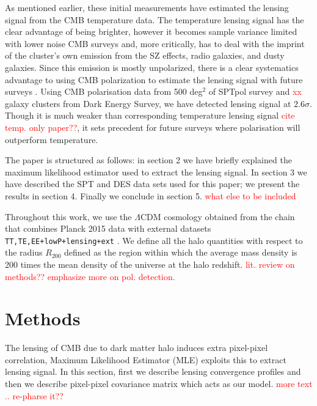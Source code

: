 \documentclass[twocolumn]{aastex61}
\newcommand{\pending}[1]{\textcolor{red}{#1}}
\begin{document}
As mentioned earlier, these initial measurements have estimated the lensing signal from the CMB temperature data. The temperature lensing signal has the clear advantage of being brighter, however it becomes sample variance limited with lower noise CMB surveys \citep{hu07, raghunathan17a} and, more critically, has to deal with the imprint of the cluster's own emission from the SZ effects, radio galaxies, and dusty galaxies. Since this emission is mostly unpolarized, there is a clear systematics advantage to using CMB polarization to estimate the lensing signal with future surveys \citep[hereafter ]{raghunathan17a}. Using CMB polarisation data from 500 deg$^2$ of SPTpol survey and \pending{xx} galaxy clusters from Dark Energy Survey, we have detected lensing signal at $2.6 \sigma$. Though it is much weaker than corresponding temperature lensing signal \pending{cite temp. only paper??}, it sets precedent for future surveys where polarisation will outperform temperature. 

The paper is structured as follows: in section 2 we have briefly explained the maximum likelihood estimator used to extract the lensing signal. In section 3 we have described the SPT and DES data sets used for this paper; we present the results in section 4. Finally we conclude in section 5.  \pending{what else to be included} 

Throughout this work, we use the $\Lambda$CDM cosmology obtained from the chain that combines Planck 2015 data with external datasets \texttt{TT,TE,EE+lowP+lensing+ext} \citep{planck15-13}. We define all the halo quantities with respect to the radius $R_{200}$ defined as the region within which the average mass density is 200 times the mean density of the universe at the halo redshift.
\pending{lit. review on methods?? emphasize more on pol. detection.}
\section{Methods}
\label{sec_methods}
The lensing of CMB due to dark matter halo induces extra pixel-pixel correlation, Maximum Likelihood Estimator (MLE) exploits this to extract lensing signal. In this section, first we describe lensing convergence profiles and then we describe pixel-pixel covariance matrix which acts as our model.
\pending{more text .. re-pharse it??}
\end{document}
